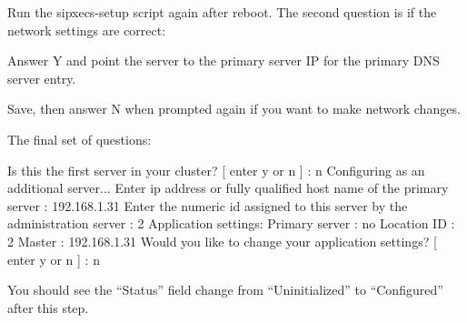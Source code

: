 \documentclass[letterpaper,10pt,english]{sphinxmanual}
\begin{document}
Run the sipxecs-setup script again after reboot. The second question is if the network settings are correct:

\begin{sphinxVerbatim}[commandchars=\\\{\}]
    
 
     
      \PYG{l+s+s1}{s  network settings? [ enter }\PYG{l+s+s1}{ ] :}
\end{sphinxVerbatim}

Answer Y and point the server to the primary server IP for the primary DNS server entry.
\begin{quote}

\end{quote}

Save, then answer N when prompted again if you want to make network changes.

The final set of questions:

\begin{sphinxVerbatim}[commandchars=\\\{\}]
Is this the first server in your cluster? [ enter \PYGZsq{}y\PYGZsq{} or \PYGZsq{}n\PYGZsq{} ] : n
Configuring as an additional server...
Enter ip address or fully qualified host name of the primary server : 192.168.1.31
Enter the numeric id assigned to this server by the administration server : 2
Application settings:
Primary server : no
Location ID    : 2
Master         : 192.168.1.31
Would you like to change your application settings? [ enter \PYGZsq{}y\PYGZsq{} or \PYGZsq{}n\PYGZsq{} ] : n
\end{sphinxVerbatim}

You should see the “Status” field change from “Uninitialized” to “Configured” after this step.
\begin{quote}

\end{quote}
\end{document}
